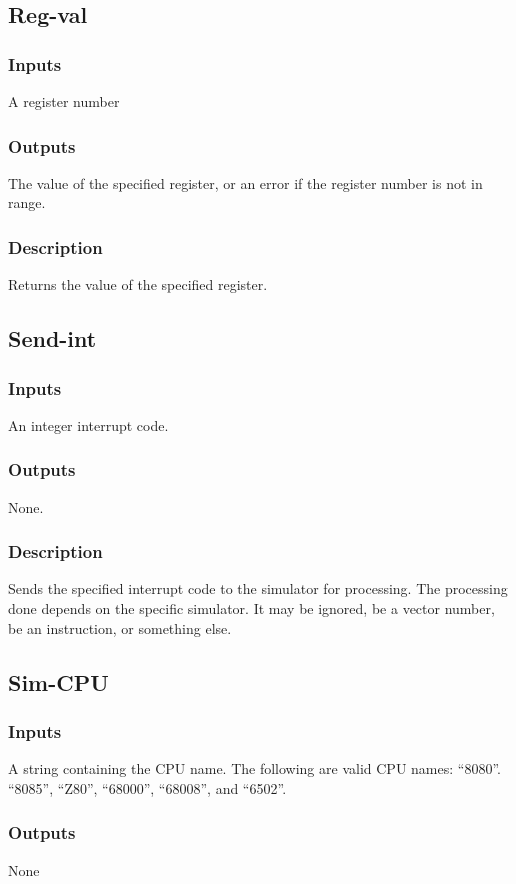 \documentclass[10pt, openany]{book}
\begin{document}
\subsection{Reg-val}
\subsubsection{Inputs}
A register number
\subsubsection{Outputs}
The value of the specified register, or an error if the register number is not in range.
\subsubsection{Description}
Returns the value of the specified register.

\subsection{Send-int}
\subsubsection{Inputs}
An integer interrupt code.
\subsubsection{Outputs}
None.
\subsubsection{Description}
Sends the specified interrupt code to the simulator for processing.  The processing done depends on the specific simulator.  It may be ignored, be a vector number, be an instruction, or something else.

\subsection{Sim-CPU}
\subsubsection{Inputs}
A string containing the CPU name.  The following are valid CPU names:  ``8080''. ``8085'', ``Z80'', ``68000'', ``68008'', and ``6502''.
\subsubsection{Outputs}
None
\end{document}
